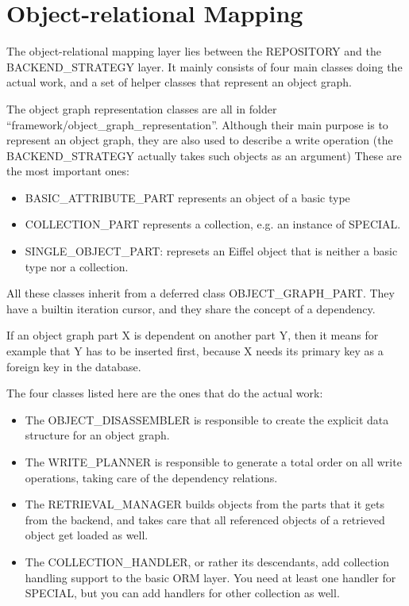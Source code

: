 \section{Object-relational Mapping}
\label{section:ORM}

The object-relational mapping layer lies between the REPOSITORY and the BACKEND\_STRATEGY layer.
It mainly consists of four main classes doing the actual work, and a set of helper classes that represent an object graph.

The object graph representation classes are all in folder ``framework/object\_graph\_representation''. 
Although their main purpose is to represent an object graph, they are also used to describe a write operation (the BACKEND\_STRATEGY actually takes such objects as an argument)
These are the most important ones:

\begin{itemize}
 \item BASIC\_ATTRIBUTE\_PART represents an object of a basic type
 \item COLLECTION\_PART represents a collection, e.g. an instance of SPECIAL.
 \item SINGLE\_OBJECT\_PART: represets an Eiffel object that is neither a basic type nor a collection.
\end{itemize}

All these classes inherit from a deferred class OBJECT\_GRAPH\_PART. 
They have a builtin iteration cursor, and they share the concept of a dependency.

If an object graph part X is dependent on another part Y, then it means for example that Y has to be inserted first, because X needs its primary key as a foreign key in the database.

The four classes listed here are the ones that do the actual work:

\begin{itemize}
 \item The OBJECT\_DISASSEMBLER is responsible to create the explicit data structure for an object graph.
 \item The WRITE\_PLANNER is responsible to generate a total order on all write operations, taking care of the dependency relations.
 \item The RETRIEVAL\_MANAGER builds objects from the parts that it gets from the backend, and takes care that all referenced objects of a retrieved object get loaded as well.
 \item The COLLECTION\_HANDLER, or rather its descendants, add collection handling support to the basic ORM layer. 
 You need at least one handler for SPECIAL, but you can add handlers for other collection as well.
\end{itemize}

